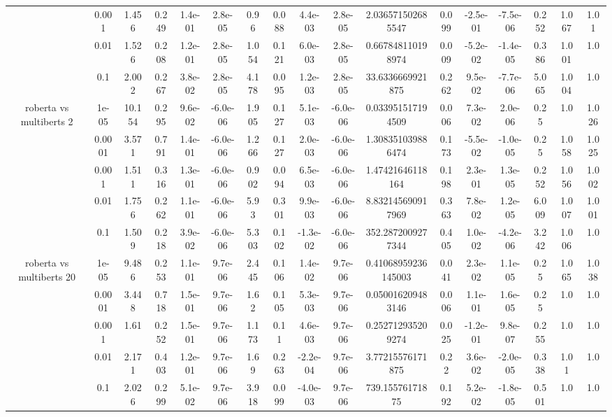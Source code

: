 \begin{tabular}{|c|c|c|c|c|c|c|c|c|c|c|c|c|c|c|c|c|}
 & 0.001 & 1.456 & 0.249 & 1.4e-01 & 2.8e-05 & 0.96 & 0.088 & 4.4e-03 & 2.8e-05 & 2.036571502685547 & 0.099 & -2.5e-01 & -7.5e-06 & 0.252 & 1.067 & 1.01 \\
 & 0.01 & 1.526 & 0.208 & 1.2e-01 & 2.8e-05 & 1.054 & 0.121 & 6.0e-03 & 2.8e-05 & 0.667848110198974 & 0.009 & -5.2e-02 & -1.4e-05 & 0.386 & 1.001 & 1.0 \\
 & 0.1 & 2.002 & 0.267 & 3.8e-02 & 2.8e-05 & 4.178 & 0.095 & 1.2e-03 & 2.8e-05 & 33.6336669921875 & 0.262 & 9.5e-02 & -7.7e-06 & 5.065 & 1.004 & 1.0 \\
\hline
\multirow{5}{*}{roberta  vs multiberts 2} & 1e-05 & 10.154 & 0.295 & 9.6e-02 & -6.0e-06 & 1.905 & 0.127 & 5.1e-03 & -6.0e-06 & 0.033951517194509 & 0.006 & 7.3e-02 & 2.0e-06 & 0.25 & 1.0 & 1.026 \\
 & 0.0001 & 3.571 & 0.791 & 1.4e-01 & -6.0e-06 & 1.266 & 0.127 & 2.0e-03 & -6.0e-06 & 1.308351039886474 & 0.173 & -5.5e-02 & -1.0e-05 & 0.25 & 1.058 & 1.025 \\
 & 0.001 & 1.511 & 0.316 & 1.3e-01 & -6.0e-06 & 0.902 & 0.094 & 6.5e-03 & -6.0e-06 & 1.47421646118164 & 0.198 & 2.3e-01 & 1.3e-05 & 0.252 & 1.056 & 1.002 \\
 & 0.01 & 1.756 & 0.262 & 1.1e-01 & -6.0e-06 & 5.93 & 0.301 & 9.9e-03 & -6.0e-06 & 8.832145690917969 & 0.363 & 7.8e-02 & 1.2e-05 & 6.009 & 1.007 & 1.001 \\
 & 0.1 & 1.509 & 0.218 & 3.9e-02 & -6.0e-06 & 5.303 & 0.102 & -1.3e-02 & -6.0e-06 & 352.2872009277344 & 0.405 & 1.0e-02 & -4.2e-06 & 3.242 & 1.006 & 1.0 \\
\hline
\multirow{5}{*}{roberta  vs multiberts 20} & 1e-05 & 9.486 & 0.253 & 1.1e-01 & 9.7e-06 & 2.445 & 0.106 & 1.4e-02 & 9.7e-06 & 0.41068959236145003 & 0.041 & 2.3e-02 & 1.1e-05 & 0.25 & 1.065 & 1.038 \\
 & 0.0001 & 3.448 & 0.718 & 1.5e-01 & 9.7e-06 & 1.62 & 0.105 & 5.3e-03 & 9.7e-06 & 0.050016209483146 & 0.006 & 1.1e-01 & 1.6e-05 & 0.25 & 1.0 & 1.0 \\
 & 0.001 & 1.61 & 0.252 & 1.5e-01 & 9.7e-06 & 1.173 & 0.11 & 4.6e-03 & 9.7e-06 & 0.252712935209274 & 0.025 & -1.2e-01 & 9.8e-07 & 0.255 & 1.0 & 1.0 \\
 & 0.01 & 2.171 & 0.403 & 1.2e-01 & 9.7e-06 & 1.69 & 0.263 & -2.2e-04 & 9.7e-06 & 3.77215576171875 & 0.22 & 3.6e-02 & -2.0e-05 & 0.338 & 1.01 & 1.0 \\
 & 0.1 & 2.026 & 0.299 & 5.1e-02 & 9.7e-06 & 3.918 & 0.099 & -4.0e-03 & 9.7e-06 & 739.15576171875 & 0.192 & 5.2e-02 & -1.8e-05 & 0.501 & 1.0 & 1.0 \\

\end{tabular}
